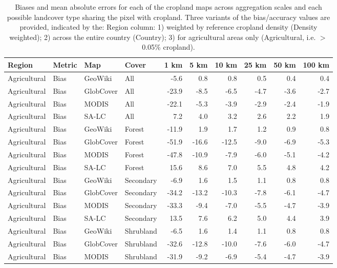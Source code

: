 \begin{longtable}{llllrrrrrr}
\caption{Biases and mean absolute errors for each of the cropland maps across aggregation scales and each possible landcover type sharing the pixel with cropland. Three variants of the bias/accuracy values are provided, indicated by the: Region column: 1) weighted by reference cropland density (Density weighted); 2) across the entire country (Country); 3) for agricultural areas only (Agricultural, i.e. $>$0.05\% cropland).} \\ 
  \hline
Region & Metric & Map & Cover & 1 km & 5 km & 10 km & 25 km & 50 km & 100 km \\ 
  \hline
Agricultural & Bias & GeoWiki & All & -5.6 & 0.8 & 0.8 & 0.5 & 0.4 & 0.4 \\ 
  Agricultural & Bias & GlobCover & All & -23.9 & -8.5 & -6.5 & -4.7 & -3.6 & -2.7 \\ 
  Agricultural & Bias & MODIS & All & -22.1 & -5.3 & -3.9 & -2.9 & -2.4 & -1.9 \\ 
  Agricultural & Bias & SA-LC & All & 7.2 & 4.0 & 3.2 & 2.6 & 2.2 & 1.9 \\ 
  Agricultural & Bias & GeoWiki & Forest & -11.9 & 1.9 & 1.7 & 1.2 & 0.9 & 0.8 \\ 
  Agricultural & Bias & GlobCover & Forest & -51.9 & -16.6 & -12.5 & -9.0 & -6.9 & -5.3 \\ 
  Agricultural & Bias & MODIS & Forest & -47.8 & -10.9 & -7.9 & -6.0 & -5.1 & -4.2 \\ 
  Agricultural & Bias & SA-LC & Forest & 15.6 & 8.6 & 7.0 & 5.5 & 4.8 & 4.2 \\ 
  Agricultural & Bias & GeoWiki & Secondary & -6.9 & 1.6 & 1.5 & 1.1 & 0.8 & 0.8 \\ 
  Agricultural & Bias & GlobCover & Secondary & -34.2 & -13.2 & -10.3 & -7.8 & -6.1 & -4.7 \\ 
  Agricultural & Bias & MODIS & Secondary & -33.3 & -9.4 & -7.0 & -5.5 & -4.7 & -3.9 \\ 
  Agricultural & Bias & SA-LC & Secondary & 13.5 & 7.6 & 6.2 & 5.0 & 4.4 & 3.9 \\ 
  Agricultural & Bias & GeoWiki & Shrubland & -6.5 & 1.6 & 1.4 & 1.1 & 0.8 & 0.8 \\ 
  Agricultural & Bias & GlobCover & Shrubland & -32.6 & -12.8 & -10.0 & -7.6 & -6.0 & -4.7 \\ 
  Agricultural & Bias & MODIS & Shrubland & -31.9 & -9.2 & -6.9 & -5.4 & -4.7 & -3.9 \\ 

\end{longtable}
